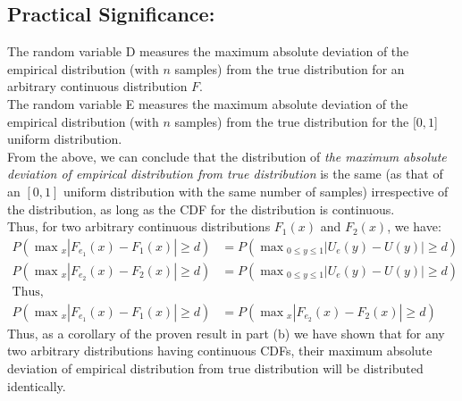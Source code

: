 \documentclass[11pt, fleqn]{article}
\begin{document}
\subsection*{Practical Significance:}


The random variable D measures the maximum absolute deviation of the empirical distribution (with $n$ samples) from the true distribution for an arbitrary continuous distribution $F$.\\
The random variable E measures the maximum absolute deviation of the empirical distribution (with $n$ samples) from the true distribution for the $[0, 1$] uniform distribution.\\
From the above, we can conclude that the distribution of \textit{the maximum absolute deviation of empirical distribution from true distribution} is the same (as that of an $[0, 1]$ uniform distribution with the same number of samples) irrespective of the distribution, as long as the CDF for the distribution is continuous.\\
Thus, for two arbitrary continuous distributions $F_1(x)$ and $F_2(x)$, we have:
$$
\begin{aligned}
    P(\max{}_x | F_{e_1}(x) - F_1(x) | \ge d) &= P(\max{}_{0\le y\le 1} | U_e(y) - U(y) | \ge d)\\
    P(\max{}_x | F_{e_2}(x) - F_2(x) | \ge d) &= P(\max{}_{0\le y\le 1} | U_e(y) - U(y) | \ge d)\\
    \text{Thus, }\\
    P(\max{}_x | F_{e_1}(x) - F_1(x) | \ge d) &= P(\max{}_x | F_{e_2}(x) - F_2(x) | \ge d)
\end{aligned}
$$
Thus, as a corollary of the proven result in part (b) we have shown that for any two arbitrary distributions having continuous CDFs, their maximum absolute deviation of empirical distribution from true distribution will be distributed identically.
\end{document}
